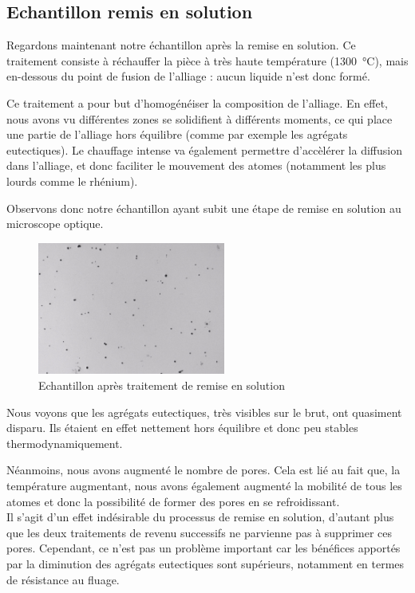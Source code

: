 \subsection*{Echantillon remis en solution}

Regardons maintenant notre échantillon après la remise en solution. 
Ce traitement consiste à réchauffer la pièce à très haute température (\SI{1300}{\celsius}),
mais en-dessous du point de fusion de l'alliage : aucun liquide n'est donc formé. 

Ce traitement a pour but d'homogénéiser la composition de l'alliage. En effet, nous avons 
vu différentes zones se solidifient à différents moments, ce qui place une partie de l'alliage
hors équilibre (comme par exemple les agrégats eutectiques). Le chauffage intense va également 
permettre d'accèlérer la diffusion dans l'alliage, et donc faciliter le mouvement des atomes 
(notamment les plus lourds comme le rhénium). 

Observons donc notre échantillon ayant subit une étape de remise en solution au microscope optique.

\begin{figure}[htbp]
    \centering
    \includegraphics[width=0.55\textwidth]{images_optique/res.pdf}
    \caption{Echantillon après traitement de remise en solution}
    \label{<label>}
\end{figure}

Nous voyons que les agrégats eutectiques, très visibles sur le brut, ont quasiment disparu.
Ils étaient en effet nettement hors équilibre et donc peu stables thermodynamiquement. 

Néanmoins, nous avons augmenté le nombre de pores. Cela est lié au fait que, la température 
augmentant, nous avons également augmenté la mobilité de tous les atomes et donc la possibilité
de former des pores en se refroidissant.\\

Il s'agit d'un effet indésirable du processus de remise en solution, d'autant plus que 
les deux traitements de revenu successifs ne parvienne pas à supprimer ces pores. 
Cependant, ce n'est pas un problème important car les bénéfices apportés par la diminution des 
agrégats eutectiques sont supérieurs, notamment en termes de résistance au fluage. \\

